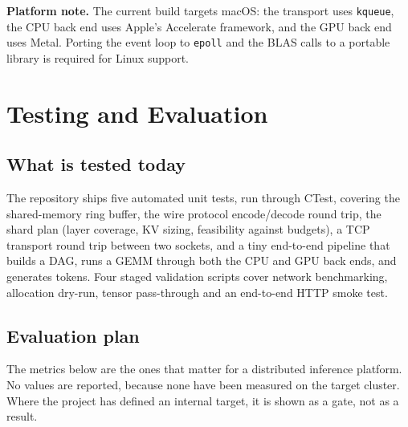 \documentclass[11pt,a4paper]{article}
\begin{document}
\textbf{Platform note.} The current build targets macOS: the transport uses
\texttt{kqueue}, the CPU back end uses Apple's Accelerate framework, and the GPU
back end uses Metal. Porting the event loop to \texttt{epoll} and the BLAS calls
to a portable library is required for Linux support.

\section{Testing and Evaluation}
\label{sec:eval}

\subsection{What is tested today}

The repository ships five automated unit tests, run through CTest, covering the
shared-memory ring buffer, the wire protocol encode/decode round trip, the shard
plan (layer coverage, KV sizing, feasibility against budgets), a TCP transport
round trip between two sockets, and a tiny end-to-end pipeline that builds a DAG,
runs a GEMM through both the CPU and GPU back ends, and generates tokens. Four
staged validation scripts cover network benchmarking, allocation dry-run, tensor
pass-through and an end-to-end HTTP smoke test.

\subsection{Evaluation plan}

The metrics below are the ones that matter for a distributed inference platform.
No values are reported, because none have been measured on the target cluster.
Where the project has defined an internal target, it is shown as a gate, not as
a result.
\end{document}
